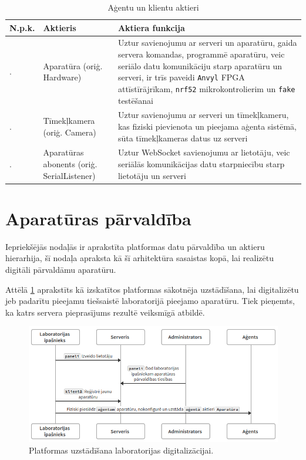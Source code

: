 \begin{table}[H]
    \newcommand\rownumber{\stepcounter{cliactorcounter}\arabic{cliactorcounter}.}
    \begin{tabular}{ |p{1cm}|p{5cm}|p{9cm}| }
    \hline
    N.p.k.&Aktieris&Aktiera funkcija \\
    \hline
    \rownumber & Aparatūra (oriģ. Hardware) & Uztur savienojumu ar serveri un
        aparatūru, gaida servera komandas, programmē aparatūru, veic seriālo
        datu komunikāciju starp aparatūru un serveri, ir trīs paveidi
        \lstinline!Anvyl! FPGA attīstīrājrīkam, \lstinline!nrf52!
        mikrokontrolierim un \lstinline!fake! testēšanai \\
    \hline
    \rownumber & Tīmekļkamera (oriģ. Camera) & Uztur savienojumu ar serveri un
        tīmekļkameru, kas fiziski pievienota un pieejama aģenta sistēmā, sūta
        tīmekļkameras datus uz serveri \\
    \hline
    \rownumber & Aparatūras abonents (oriģ. SerialListener) & Uztur WebSocket
        savienojumu ar lietotāju, veic seriālās komunikācijas datu starpniecību
        starp lietotāju un serveri \\
    \hline
    \end{tabular}
    \centering
    \captionsetup{justification=centering}
    \caption{Aģentu un klientu aktieri}
    \label{table:cliactors}
\end{table}

\section{Aparatūras pārvaldība}
\label{sec:hwmgmt}

Iepriekšējās nodaļās ir aprakstīta platformas datu pārvaldība un aktieru
hierarhija, šī nodaļa apraksta kā šī arhitektūra sasaistas kopā, lai realizētu
digitāli pārvaldāmu aparatūru.

Attēlā \ref{fig:labsetup} aprakstīts kā izskatītos platformas sākotnēja
uzstādīšana, lai digitalizētu jeb padarītu pieejamu tiešsaistē laboratorijā
pieejamo aparatūru. Tiek pieņemts, ka katrs servera pieprasījums rezultē
veiksmīgā atbildē.

\begin{figure}[H]
    \includegraphics[width=1.0\linewidth]{assets/lab.png}
    \centering
    \caption{Platformas uzstādīšana laboratorijas digitalizācijai.}
    \label{fig:labsetup}
\end{figure}

